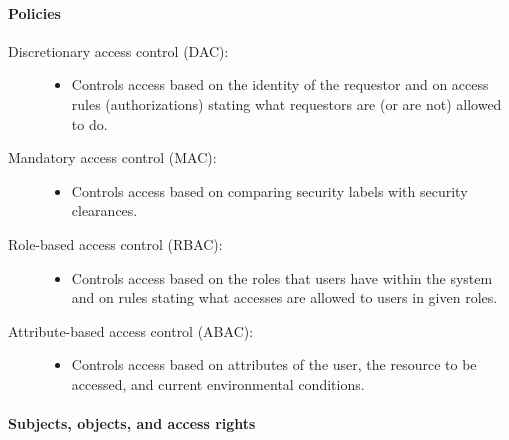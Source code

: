 \documentclass{article}
\begin{document}
                \paragraph{Policies}
                    \begin{description}
                        \item[Discretionary access control (DAC):]
                        \begin{itemize}
                            \item Controls access based on the identity of the requestor and on access rules (authorizations) stating what requestors are (or are not) allowed to do.
                        \end{itemize}
                        \item[Mandatory access control (MAC):]
                        \begin{itemize}
                            \item Controls access based on comparing security labels with security clearances.
                        \end{itemize}
                        \item[Role-based access control (RBAC):]
                        \begin{itemize}
                            \item Controls access based on the roles that users have within the system and on rules stating what accesses are allowed to users in given roles.
                        \end{itemize}
                        \item[Attribute-based access control (ABAC):]
                        \begin{itemize}
                            \item Controls access based on attributes of the user, the resource to be accessed, and current environmental conditions.
                        \end{itemize}
                    \end{description}
                
                \paragraph{Subjects,
                objects, and
                access rights}
\end{document}

